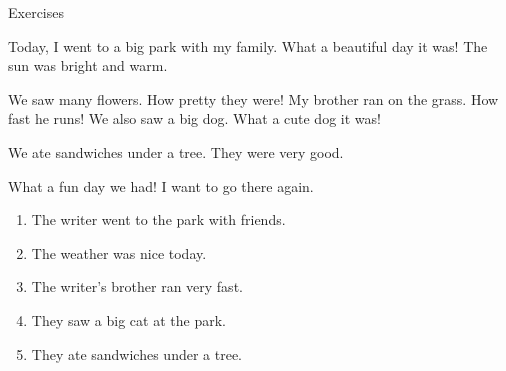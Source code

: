 \documentclass[aspectratio=169,xcolor={dvipsnames,table}]{beamer}
\begin{document}
\begin{frame}[plain,t]{Exercises}
  \vspace{-8pt}
  \begin{tcolorbox}[colframe=ForestGreen,
      colback=NavyBlue!10!white,
      colbacktitle=NavyBlue!40!white,
      coltitle=black, %
      before upper={\setlength{\parindent}{1.25em}},
      title={A Day at the Park}\hfill{\tiny 0047}\,{\scriptsize \myaudio{./audio/hoge_reading.mp3}}\,{\tiny reading}
    ]
    \noindent{}Today, I went to a big park with my family.
    What a beautiful day it was!
    The sun was bright and warm.

    We saw many flowers.
    How pretty they were!
    My brother ran on the grass.
    How fast he runs!
    We also saw a big dog.
    What a cute dog it was!

    We ate sandwiches under a tree.
    They were very good.

    What a fun day we had!
    I want to go there again.
  \end{tcolorbox}

  \vspace{-4pt}
  \vspace{-11pt}
  \begin{enumerate}\setlength{\itemsep}{-3.4pt}
    \item<2-> The writer went to the park with friends.\hfill{}
    \item<2-> The weather was nice today.\hfill{}
    \item<2-> The writer's brother ran very fast.\hfill{}
    \item<2-> They saw a big cat at the park.\hfill{}
    \item<2-> They ate sandwiches under a tree.\hfill{}
  \end{enumerate}
\end{frame}
\end{document}
